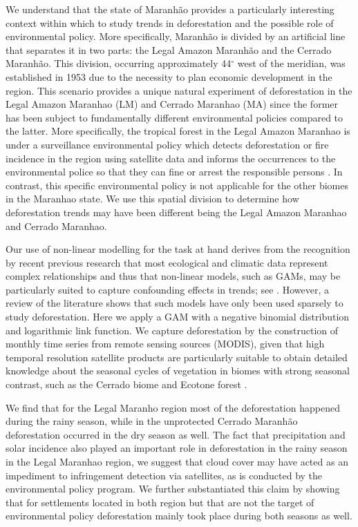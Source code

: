 We understand that the state of Maranhão provides a particularly interesting context within which to study trends in deforestation and the possible role of environmental policy. More specifically, Maranhão is divided by an artificial line that separates it in two parts: the Legal Amazon Maranhão and the Cerrado Maranhão. This division, occurring approximately 44$^{\circ}$ west of the meridian, was established in 1953 due to the necessity to plan economic development in the region. This scenario provides a unique natural experiment of deforestation in the Legal Amazon Maranhao (LM) and Cerrado Maranhao (MA) since the former has been subject to fundamentally different environmental policies compared to the latter. More specifically, the tropical forest in the Legal Amazon Maranhao is under a surveillance environmental policy which detects deforestation or fire incidence in the region using satellite data and informs the occurrences to the environmental police so that they can fine or arrest the responsible persons \citep{IBAMAwebsite}. In contrast, this specific environmental policy is not applicable for the other biomes in the Maranhao state. We use this spatial division to determine how deforestation trends may have been different being the Legal Amazon Maranhao and Cerrado Maranhao.

Our use of non-linear modelling for the task at hand derives from the recognition by recent previous research that most ecological and climatic data represent complex relationships and thus that non-linear models, such as GAMs, may be particularly suited to capture confounding effects in trends; see \citep{alkemad_1998,BELL_2015,JOYE_2015,LUSK_2016,SADAT_2016,HALPERIN_2016, SANTOS_2017,TAPIA_2017, LIU_2018,MORENO_2018}. However, a review of the literature shows that such models have only been used sparsely to study deforestation. Here we apply a GAM with a negative binomial distribution and logarithmic link function. We capture deforestation by the construction of monthly time series from remote sensing sources (MODIS), given that high temporal resolution satellite products are particularly suitable to obtain detailed knowledge about the seasonal cycles of vegetation in biomes with strong seasonal contrast, such as the Cerrado biome and Ecotone forest \citep{bayma_sano_2015}. 

We find that for the Legal Maranho region most of the deforestation happened during the rainy season, while in the unprotected Cerrado Maranhão deforestation occurred in the dry season as well. The fact that precipitation and solar incidence also played an important role in deforestation in the rainy season in the Legal Maranhao region, we suggest that cloud cover may have acted as an impediment to infringement detection via satellites, as is conducted by the environmental policy program. We further substantiated this claim by showing that for settlements located in both region but that are not the target of environmental policy deforestation mainly took place during both seasons as well.     


